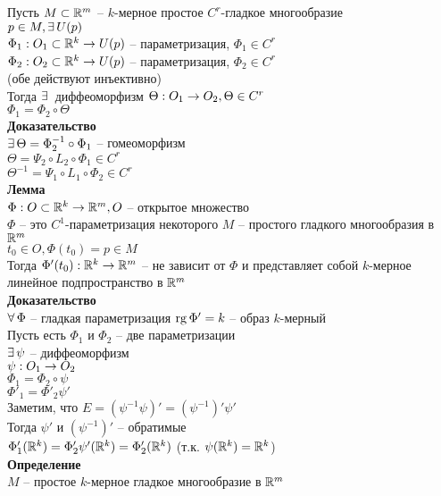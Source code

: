 \documentclass[12pt]{article}
\begin{document}
Пусть $M \subset \mathbb{R}^m$ -- $k$-мерное простое $C^r$-гладкое многообразие\\
$p\in M, \exists\, U(p)$\\
$\Phi_1: O_1\subset \mathbb{R}^k \rightarrow U(p)$ -- параметризация, $\Phi_1 \in C^r$\\
$\Phi_2: O_2\subset \mathbb{R}^k \rightarrow U(p)$ -- параметризация, $\Phi_2 \in C^r$\\
(обе действуют инъективно)\\
Тогда $\exists\,$ диффеоморфизм $\Theta: O_1 \rightarrow O_2, \Theta \in C^r$\\
$\Phi_1 = \Phi_2\circ \Theta$\\
\textbf{Доказательство}\\
$\exists\, \Theta = \Phi_2^{-1}\circ \Phi_1$ -- гомеоморфизм\\
$\Theta=\Psi_2\circ L_2\circ \Phi_1\in C^r$\\
$\Theta^{-1} = \Psi_1 \circ L_1 \circ \Phi_2 \in C^r$\\
\textbf{Лемма}\\
$\Phi: O\subset \mathbb{R}^k \rightarrow \mathbb{R}^m, O$ -- открытое множество\\
$\Phi$ -- это $C^1$-параметризация некоторого $M$ -- простого гладкого многообразия в $\mathbb{R}^m$\\
$t_0 \in O, \Phi(t_0) = p\in M$\\
Тогда $\Phi'(t_0): \mathbb{R}^k \rightarrow \mathbb{R}^m$ -- не зависит от $\Phi$ и представляет собой $k$-мерное линейное подпространство в $\mathbb{R}^m$\\
\textbf{Доказательство}\\
$\forall\, \Phi$ -- гладкая параметризация $\operatorname{rg} \Phi' = k$ -- образ $k$-мерный\\
Пусть есть $\Phi_1$ и $\Phi_2$ -- две параметризации\\
$\exists\, \psi$ -- диффеоморфизм\\
$\psi: O_1 \rightarrow O_2$\\
$\Phi_1 = \Phi_2 \circ \psi$\\
$\Phi'_1 = \Phi'_2 \psi'$\\
Заметим, что $E = (\psi^{-1}\psi)' = (\psi^{-1})' \psi'$\\
Тогда $\psi'$ и $(\psi^{-1})'$ -- обратимые\\
$\Phi'_1(\mathbb{R}^k) = \Phi'_2\psi'(\mathbb{R}^k) = \Phi'_2(\mathbb{R}^k)$ (т.к. $\psi(\mathbb{R}^k) = \mathbb{R}^k$)\\
\textbf{Определение}\\
$M$ -- простое $k$-мерное гладкое многообразие в $\mathbb{R}^m$\\
\end{document}
